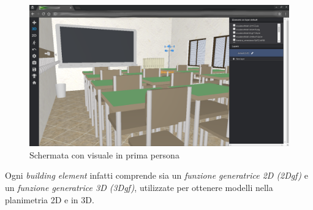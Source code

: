 \begin{figure}[htbp] %
   \centering
   \includegraphics[width=1\linewidth]{images/3d-school}
   \caption{Schermata con visuale in prima persona}
   \label{fig:1D-school}
\end{figure}

Ogni \emph{building element} infatti comprende sia un \emph{funzione generatrice 2D (2Dgf)} e un
\emph{funzione generatrice 3D (3Dgf)}, utilizzate per ottenere modelli nella planimetria 2D e in 3D.
\newpage
